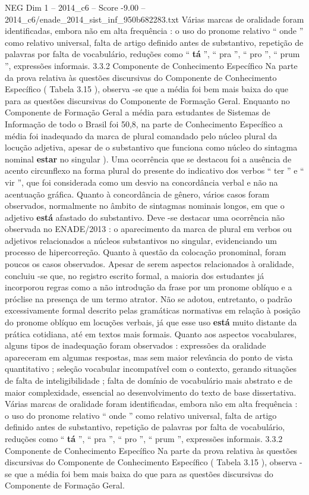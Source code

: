\begin{textsample}{NEG Dim 1 – 2014\_c6 – Score -9.00 – 2014\_c6/enade\_2014\_sist\_inf\_950b682283.txt}
Várias marcas de oralidade foram identificadas, embora não em alta frequência : o uso do pronome relativo “ onde ” como relativo universal, falta de artigo definido antes de substantivo, repetição de palavras por falta de vocabulário, reduções como “ \textbf{tá} ”, “ pra ”, “ pro ”, “ prum ”, expressões informais. 3.3.2 Componente de Conhecimento Específico Na parte da prova relativa às questões discursivas do Componente de Conhecimento Específico ( Tabela 3.15 ), observa -se que a média foi bem mais baixa do que para as questões discursivas do Componente de Formação Geral.
Enquanto no Componente de Formação Geral a média para estudantes de Sistemas de Informação de todo o Brasil foi 50,8, na parte de Conhecimento Específico a média foi inadequado da marca de plural comandado pelo núcleo plural da locução adjetiva, apesar de o substantivo que funciona como núcleo do sintagma nominal \textbf{estar} no singular ).
Uma ocorrência que se destacou foi a ausência de acento circunflexo na forma plural do presente do indicativo dos verbos “ ter ” e “ vir ”, que foi considerada como um desvio na concordância verbal e não na acentuação gráfica.
Quanto à concordância de gênero, vários casos foram observados, normalmente no âmbito de sintagmas nominais longos, em que o adjetivo \textbf{está} afastado do substantivo.
Deve -se destacar uma ocorrência não observada no ENADE/2013 : o aparecimento da marca de plural em verbos ou adjetivos relacionados a núcleos substantivos no singular, evidenciando um processo de hipercorreção.
Quanto à questão da colocação pronominal, foram poucos os casos observados.
Apesar de serem aspectos relacionados à oralidade, concluiu -se que, no registro escrito formal, a maioria dos estudantes já incorporou regras como a não introdução da frase por um pronome oblíquo e a próclise na presença de um termo atrator.
Não se adotou, entretanto, o padrão excessivamente formal descrito pelas gramáticas normativas em relação à posição do pronome oblíquo em locuções verbais, já que esse uso \textbf{está} muito distante da prática cotidiana, até em textos mais formais.
Quanto aos aspectos vocabulares, alguns tipos de inadequação foram observados : expressões da oralidade apareceram em algumas respostas, mas sem maior relevância do ponto de vista quantitativo ; seleção vocabular incompatível com o contexto, gerando situações de falta de inteligibilidade ; falta de domínio de vocabulário mais abstrato e de maior complexidade, essencial ao desenvolvimento do texto de base dissertativa.
Várias marcas de oralidade foram identificadas, embora não em alta frequência : o uso do pronome relativo “ onde ” como relativo universal, falta de artigo definido antes de substantivo, repetição de palavras por falta de vocabulário, reduções como “ \textbf{tá} ”, “ pra ”, “ pro ”, “ prum ”, expressões informais. 3.3.2 Componente de Conhecimento Específico Na parte da prova relativa às questões discursivas do Componente de Conhecimento Específico ( Tabela 3.15 ), observa -se que a média foi bem mais baixa do que para as questões discursivas do Componente de Formação Geral.

\end{textsample}
